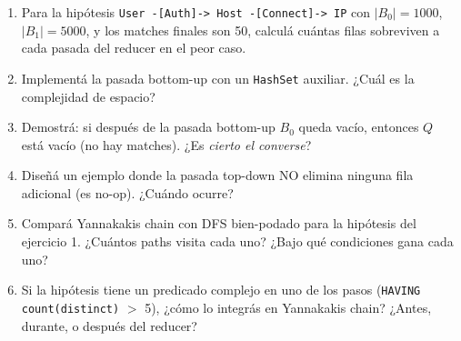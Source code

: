 \begin{ejercicios}
\begin{enumerate}
    \item \starred{} Para la hipótesis
    \texttt{User -[Auth]-> Host -[Connect]-> IP} con \(|B_0| =
    1000\), \(|B_1| = 5000\), y los matches finales son 50, calculá
    cuántas filas sobreviven a cada pasada del reducer en el peor
    caso.

    \item Implementá la pasada bottom-up con un \texttt{HashSet}
    auxiliar. ¿Cuál es la complejidad de espacio?

    \item \starred{} Demostrá: si después de la pasada bottom-up
    \(B_0\) queda vacío, entonces \(Q\) está vacío (no hay matches).
    ¿Es \emph{cierto el converse}?

    \item Diseñá un ejemplo donde la pasada top-down NO elimina
    ninguna fila adicional (es no-op). ¿Cuándo ocurre?

    \item Compará Yannakakis chain con DFS bien-podado para la
    hipótesis del ejercicio 1. ¿Cuántos paths visita cada uno?
    ¿Bajo qué condiciones gana cada uno?

    \item Si la hipótesis tiene un predicado complejo en uno de
    los pasos (\texttt{HAVING count(distinct)} \(>\) 5), ¿cómo lo
    integrás en Yannakakis chain? ¿Antes, durante, o después del
    reducer?
\end{enumerate}
\end{ejercicios}
